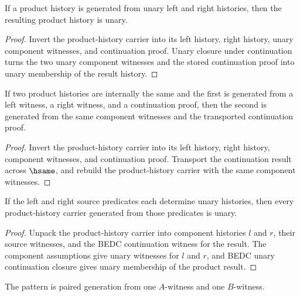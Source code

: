 \begin{theorem}
\label{thm:prod-history-carrier-unary}
If a product history is generated from unary left and right histories, then the
resulting product history is unary.
\end{theorem}
\begin{proof}
Invert the product-history carrier into its left history, right history, unary
component witnesses, and continuation proof. Unary closure under continuation
turns the two unary component witnesses and the stored continuation proof into
unary membership of the result history.
\end{proof}

\begin{theorem}
\label{thm:prod-history-carrier-hsame-transport}
If two product histories are internally the same and the first is generated from a left witness, a right witness, and a continuation proof, then the second is generated from the same component witnesses and the transported continuation proof.
\end{theorem}
\begin{proof}
Invert the product-history carrier into its left history, right history, component witnesses, and continuation proof. Transport the continuation result across \(\hsame\), and rebuild the product-history carrier with the same component witnesses.
\end{proof}

\begin{theorem}
\label{thm:prod-history-carrier-unary-of-components}
If the left and right source predicates each determine unary histories, then
every product-history carrier generated from those predicates is unary.
\end{theorem}
\begin{proof}
Unpack the product-history carrier into component histories \(l\) and \(r\),
their source witnesses, and the BEDC continuation witness for the result.
The component assumptions give unary witnesses for \(l\) and \(r\), and BEDC
unary continuation closure gives unary membership of the product result.
\end{proof}

\begin{definition}
\label{def:prod-pattern-specification}
The pattern is paired generation from one \(A\)-witness and one \(B\)-witness.
\end{definition}

